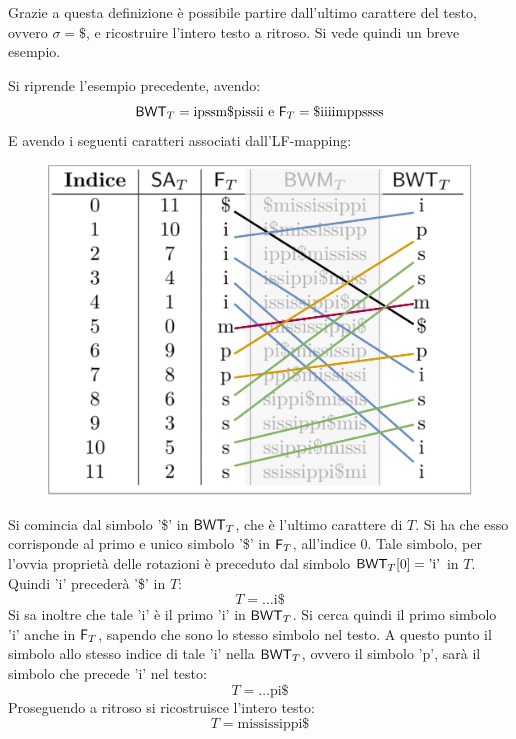 Grazie a questa definizione è possibile partire dall'ultimo carattere del testo,
ovvero $\sigma=\$$, e ricostruire l'intero testo a ritroso. Si vede quindi un
breve esempio. 
\begin{esempio}
  Si riprende l'esempio precedente, avendo:
  \[\mbox{\rm {\sf BWT}}_T=\mbox{ipssm\$pissii}\mbox{ e }\mbox{\rm {\sf F}}_T=\mbox{\$iiiimppssss}\]
  E avendo i seguenti caratteri associati dall'LF-mapping:
  \begin{figure}[H]
    \centering
    \includegraphics[scale = 0.33]{img/lf2.pdf}
  \end{figure}
  Si comincia dal simbolo '\$' in $\mbox{\rm {\sf BWT}}_T$, che è l'ultimo carattere di $T$. Si
  ha che esso corrisponde al primo e unico simbolo '\$' in $\mbox{\rm {\sf F}}_T$, all'indice
  $0$. Tale simbolo, per l'ovvia proprietà delle rotazioni è preceduto dal
  simbolo $\mbox{\rm {\sf BWT}}_T[0]=\mbox{'i'}$ in $T$. Quindi $\mbox{'i'}$ precederà '\$' in
  $T$:
  \[T=\ldots\mbox{i\$}\]
  Si sa inoltre che
  tale $\mbox{'i'}$ è il primo $\mbox{'i'}$ in $\mbox{\rm {\sf BWT}}_T$. Si cerca quindi il
  primo simbolo $\mbox{'i'}$ anche in $\mbox{\rm {\sf F}}_T$,
  sapendo che sono lo stesso simbolo nel testo. A questo punto il simbolo allo
  stesso indice di tale $\mbox{'i'}$ nella $\mbox{\rm {\sf BWT}}_T$, ovvero il simbolo
  $\mbox{'p'}$, sarà il simbolo che precede $\mbox{'i'}$ nel testo:
  \[T=\ldots\mbox{pi\$}\]
  Proseguendo a ritroso si ricostruisce l'intero testo:
  \[T=\mbox{mississippi\$}\]
\end{esempio}
